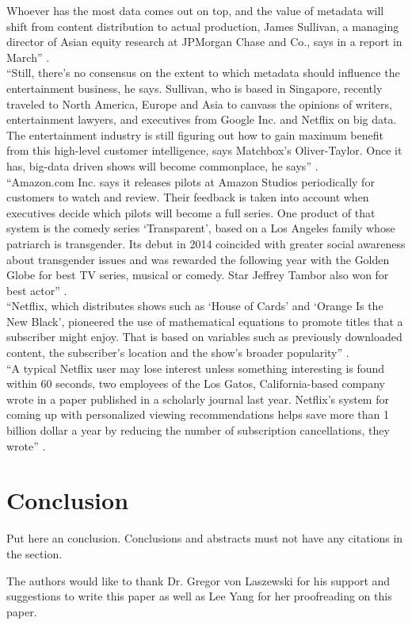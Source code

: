 \documentclass[sigconf]{acmart}
\begin{document}
Whoever has the most data comes out on top, and the value of metadata will shift from content distribution to actual production, James Sullivan, a managing director of Asian equity research at JPMorgan Chase and Co., says in a report in March'' \cite{Whitley2016data}. \\
``Still, there’s no consensus on the extent to which metadata should influence the entertainment business, he says. Sullivan, who is based in Singapore, recently traveled to North America, Europe and Asia to canvass the opinions of writers, entertainment lawyers, and executives from Google Inc. and Netflix on big data.
The entertainment industry is still figuring out how to gain maximum benefit from this high-level customer intelligence, says Matchbox’s Oliver-Taylor. Once it has, big-data driven shows will become commonplace, he says'' \cite{Whitley2016data}. \\
``Amazon.com Inc. says it releases pilots at Amazon Studios periodically for customers to watch and review. Their feedback is taken into account when executives decide which pilots will become a full series.
One product of that system is the comedy series `Transparent', based on a Los Angeles family whose patriarch is transgender. Its debut in 2014 coincided with greater social awareness about transgender issues and was rewarded the following year with the Golden Globe for best TV series, musical or comedy. Star Jeffrey Tambor also won for best actor'' \cite{Whitley2016data}. \\
``Netflix, which distributes shows such as `House of Cards' and `Orange Is the New Black', pioneered the use of mathematical equations to promote titles that a subscriber might enjoy. That is based on variables such as previously downloaded content, the subscriber's location and the show’s broader popularity'' \cite{Whitley2016data}. \\
``A typical Netflix user may lose interest unless something interesting is found within 60 seconds, two employees of the Los Gatos, California-based company wrote in a paper published in a scholarly journal last year. Netflix's system for coming up with personalized viewing recommendations helps save more than 1 billion dollar a year by reducing the number of subscription cancellations, they wrote'' \cite{Whitley2016data}. 

\section{Conclusion}

Put here an conclusion. Conclusions and abstracts must not have any
citations in the section. 

\begin{acks}

  The authors would like to thank Dr. Gregor von Laszewski for his
  support and suggestions to write this paper as well as Lee Yang for her proofreading on this paper. 

\end{acks}


 
\end{document}
